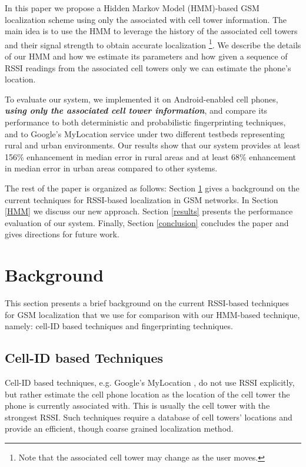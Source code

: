 \documentclass[conference]{IEEEtran}
\begin{document}
In this paper we propose a Hidden Markov Model (HMM)-based GSM
localization scheme using only the associated with cell tower
information. The main idea is to use the HMM to leverage the history
of the associated cell towers and their signal strength to obtain
accurate localization \footnote{Note that the associated cell tower
may change as the user moves.}. We describe the details of our HMM
and how we estimate its parameters and how given a sequence of RSSI
readings from the associated cell towers only we can estimate the
phone's location.

To evaluate our system, we implemented it on Android-enabled cell
phones, \emph{\textbf{using only the associated cell tower
information}}, and compare its performance to both deterministic
\cite{PlaceLab,GSM_INDOOR} and probabilistic \cite{CellSense}
fingerprinting techniques, and to Google's MyLocation service
\cite{MyLocation} under two different testbeds representing rural
and urban environments. Our results show that our system provides at
least 156\% enhancement in  median error in rural areas and at least
68\% enhancement in median error in urban areas compared to other
systems.

The rest of the paper is organized as follows:  Section
\ref{sec:background} gives a background on the current techniques
for RSSI-based localization in GSM networks. In Section \ref{HMM} we
discuss our new approach. Section \ref{results} presents the
performance evaluation of our system. Finally, Section
\ref{conclusion} concludes the paper and gives directions for future
work.


\section{Background}\label{sec:background}
This section presents a brief background on the current RSSI-based
techniques for GSM localization that we use for comparison with our
HMM-based technique, namely: cell-ID based techniques and
fingerprinting techniques.

\subsection{Cell-ID based Techniques}
Cell-ID based techniques, e.g. Google's MyLocation
\cite{MyLocation}, do not use RSSI explicitly, but rather estimate
the cell phone location as the location of the cell tower the phone
is currently associated with. This is usually the cell tower with
the strongest RSSI. Such techniques require a database of cell
towers' locations and provide an efficient, though coarse grained
localization method.
\end{document}
